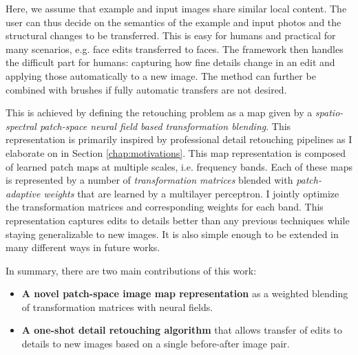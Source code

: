 Here, we assume that example and input images share similar local content. The user can thus decide on the semantics of the example and input photos and the structural changes to be transferred. This is easy for humans and practical for many scenarios, e.g. face edits transferred to faces. The framework then handles the difficult part for humans: capturing how fine details change in an edit and applying those automatically to a new image. The method can further be combined with brushes if fully automatic transfers are not desired. 

This is achieved by defining the retouching problem as a map given by a \emph{spatio-spectral patch-space neural field based transformation blending}. This representation is primarily inspired by professional detail retouching pipelines as I elaborate on in Section \ref{chap:motivations}. This map representation is composed of learned patch maps at multiple scales, i.e. frequency bands. Each of these maps is represented by a number of \emph{transformation matrices} blended with \emph{patch-adaptive weights} that are learned by a multilayer perceptron. I jointly optimize the transformation matrices and corresponding weights for each band. This representation captures edits to details better than any previous techniques while staying generalizable to new images. It is also simple enough to be extended in many different ways in future works.

In summary, there are two main contributions of this work: 

\begin{itemize}

    \item \textbf{A novel patch-space image map representation} as a weighted blending of transformation matrices with neural fields.
    
	\item \textbf{A one-shot detail retouching algorithm} that allows transfer of edits to details to new images based on a single before-after image pair.

\end{itemize}
